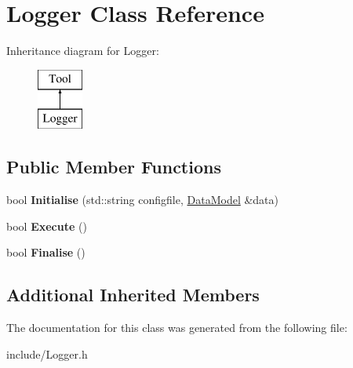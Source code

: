 \hypertarget{classLogger}{\section{Logger Class Reference}
\label{classLogger}
}
Inheritance diagram for Logger\-:\begin{figure}[H]
\begin{center}
\leavevmode
\includegraphics[height=2.000000cm]{classLogger}
\end{center}
\end{figure}
\subsection*{Public Member Functions}
\begin{DoxyCompactItemize}
\item 
\hypertarget{classLogger_a1b598f35f454e24f9e9abc9f18c3e98f}{bool {\bfseries Initialise} (std\-::string configfile, \hyperlink{classDataModel}{Data\-Model} \&data)}\label{classLogger_a1b598f35f454e24f9e9abc9f18c3e98f}

\item 
\hypertarget{classLogger_a140ebede2975159a5abe7c59e56ec0ec}{bool {\bfseries Execute} ()}\label{classLogger_a140ebede2975159a5abe7c59e56ec0ec}

\item 
\hypertarget{classLogger_a2c70367a86d5999db21324ccb58f44ed}{bool {\bfseries Finalise} ()}\label{classLogger_a2c70367a86d5999db21324ccb58f44ed}

\end{DoxyCompactItemize}
\subsection*{Additional Inherited Members}


The documentation for this class was generated from the following file\-:\begin{DoxyCompactItemize}
\item 
include/Logger.\-h\end{DoxyCompactItemize}
